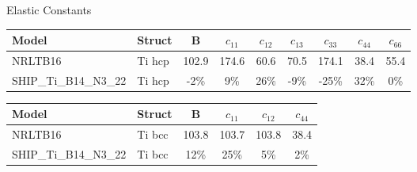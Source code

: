 \documentclass[preview]{standalone}
\begin{document}
\begin{center}
\textnormal{Elastic Constants} \\
\vspace{2mm}
\begin{tabular}{ l l c c c c c c c } \toprule 
Model & Struct & B & $c_{11}$ & $c_{12}$ & $c_{13}$ & $c_{33}$ & $c_{44}$ & $c_{66}$\\ \midrule 
NRLTB16 & Ti hcp & 102.9 & 174.6 & 60.6 & 70.5 & 174.1 & 38.4 & 55.4\\ 
SHIP\_Ti\_B14\_N3\_22 & Ti hcp & -2\% & 9\% & 26\% & -9\% & -25\% & 32\% & 0\%\\ 
\end{tabular} \bigskip \begin{tabular}{ l l c c c c } \toprule 
Model & Struct & B & $c_{11}$ & $c_{12}$ & $c_{44}$\\ \midrule 
NRLTB16 & Ti bcc & 103.8 & 103.7 & 103.8 & 38.4\\ 
SHIP\_Ti\_B14\_N3\_22 & Ti bcc & 12\% & 25\% & 5\% & 2\%\\ 
\end{tabular} \bigskip 
\end{center}
\end{document}
